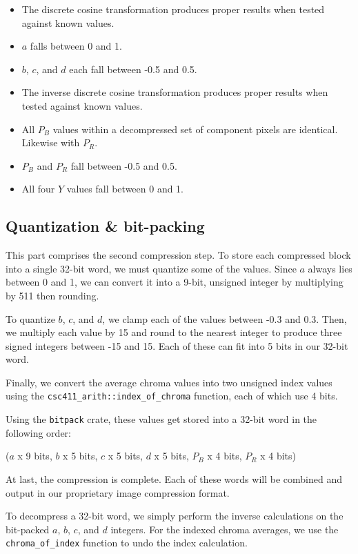 \documentclass[12pt, letterpaper]{article}
\begin{document}
    \begin{itemize}
        \item The discrete cosine transformation produces proper results when tested against known values.
        \item $a$ falls between 0 and 1.
        \item $b$, $c$, and $d$ each fall between -0.5 and 0.5.
        \item The inverse discrete cosine transformation produces proper results when tested against known values.
        \item All $P_B$ values within a decompressed set of component pixels are identical.
        Likewise with $P_R$.
        \item $P_B$ and $P_R$ fall between -0.5 and 0.5.
        \item All four $Y$ values fall between 0 and 1.

    \end{itemize}

    \subsection{Quantization \& bit-packing}

    This part comprises the second compression step.
    To store each compressed block into a single 32-bit word, we must quantize some of the values.
    Since $a$ always lies between 0 and 1, we can convert it into a 9-bit, unsigned integer by multiplying by 511
    then rounding.

    To quantize $b$, $c$, and $d$, we clamp each of the values between -0.3 and 0.3.
    Then, we multiply each value by 15 and round to the nearest integer to produce three signed integers between -15
    and 15.
    Each of these can fit into 5 bits in our 32-bit word.

    Finally, we convert the average chroma values into two unsigned index values using the
    \verb|csc411_arith::index_of_chroma| function, each of which use 4 bits.

    Using the \verb|bitpack| crate, these values get stored into a 32-bit word in the following order:

    ($a$ x 9 bits, $b$ x 5 bits, $c$ x 5 bits, $d$ x 5 bits, $P_B$ x 4 bits, $P_R$ x 4 bits)

    At last, the compression is complete.
    Each of these words will be combined and output in our proprietary image compression format.

    To decompress a 32-bit word, we simply perform the inverse calculations on the bit-packed $a$, $b$, $c$, and $d$
    integers.
    For the indexed chroma averages, we use the \verb|chroma_of_index| function to undo
    the index calculation.
\end{document}
